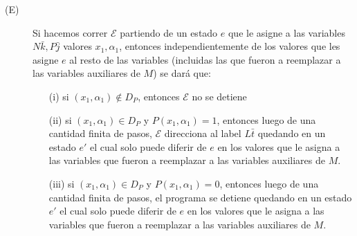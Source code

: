 \documentclass{article}
\begin{document}
\begin{enumerate}
    \begin{description}
        \item[(E)] Si hacemos correr $\mathcal{E}$ partiendo de un estado $e$ que le asigne a las variables $N \bar{k}, P \bar{j}$ valores $x_1, \alpha_1$, entonces independientemente de los valores que les asigne $e$ al resto de las variables (incluidas las que fueron a reemplazar a las variables auxiliares de $M$) se dará que:
        \begin{itemize}
            \item[(i)] si $(x_1, \alpha_1) \notin D_P$, entonces $\mathcal{E}$ no se detiene
            \item[(ii)] si $(x_1, \alpha_1) \in D_P$ y $P(x_1, \alpha_1) = 1$, entonces luego de una cantidad finita de pasos, $\mathcal{E}$ direcciona al label $L \bar{t}$ quedando en un estado $e'$ el cual solo puede diferir de $e$ en los valores que le asigna a las variables que fueron a reemplazar a las variables auxiliares de $M$. 
            \item[(iii)] si $(x_1, \alpha_1) \in D_P$ y $P(x_1, \alpha_1) = 0$, entonces luego de una cantidad finita de pasos, el programa se detiene quedando en un estado $e'$ el cual solo puede diferir de $e$ en los valores que le asigna a las variables que fueron a reemplazar a las variables auxiliares de $M$. 
        \end{itemize}
    \end{description}
\end{enumerate}
\end{document}
